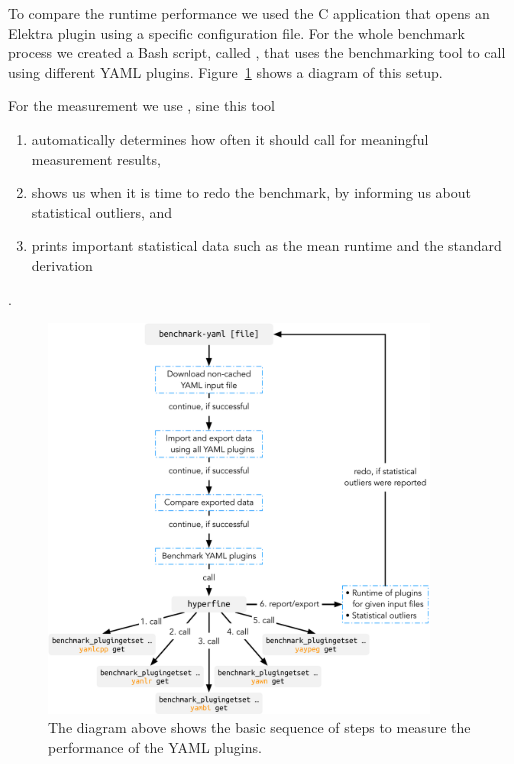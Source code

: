 To compare the runtime performance we used the C application \FilePluginGetSet{} that opens an Elektra plugin using a specific configuration file. For the whole benchmark process we created a Bash script, called \FileBenchmarkYAML{}, that uses the benchmarking tool \href{https://github.com/sharkdp/hyperfine}{} to call \FileBenchmarkPluginGetSet{} using different YAML plugins. Figure~\ref{fig:benchmark} shows a diagram of this setup.

For the measurement we use \href{https://github.com/sharkdp/hyperfine}{}, sine this tool

\begin{enumerate}
  \item automatically determines how often it should call \FilePluginGetSet{} for meaningful measurement results,
  \item shows us when it is time to redo the benchmark, by informing us about statistical outliers, and
  \item prints important statistical data such as the mean runtime and the standard derivation
\end{enumerate}

.

\begin{figure}[H]
  \centering
    \includegraphics[width=0.9\textwidth]{Figures/Benchmark}
  \caption{The diagram above shows the basic sequence of steps to measure the performance of the YAML plugins.}
  \label{fig:benchmark}
\end{figure}

